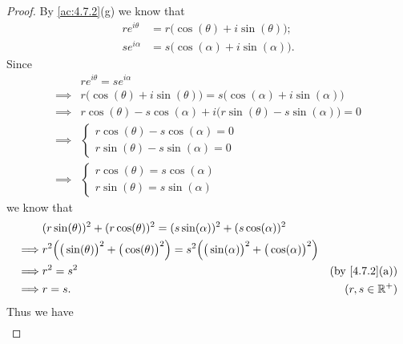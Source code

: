 \begin{proof}
  By \cref{ac:4.7.2}(g) we know that
  \begin{align*}
    r e^{i \theta} & = r \big(\cos(\theta) + i \sin(\theta)\big); \\
    s e^{i \alpha} & = s \big(\cos(\alpha) + i \sin(\alpha)\big).
  \end{align*}
  Since
  \begin{align*}
             & r e^{i \theta} = s e^{i \alpha}                                                       \\
    \implies & r \big(\cos(\theta) + i \sin(\theta)\big) = s \big(\cos(\alpha) + i \sin(\alpha)\big) \\
    \implies & r \cos(\theta) - s \cos(\alpha) + i \big(r \sin(\theta) - s \sin(\alpha)\big) = 0     \\
    \implies & \begin{cases}
                 r \cos(\theta) - s \cos(\alpha) = 0 \\
                 r \sin(\theta) - s \sin(\alpha) = 0
               \end{cases}                                                   \\
    \implies & \begin{cases}
                 r \cos(\theta) = s \cos(\alpha) \\
                 r \sin(\theta) = s \sin(\alpha)
               \end{cases}
  \end{align*}
  we know that
  \begin{align*}
             & (r \sin(\theta))^2 + (r \cos(\theta))^2 = (s \sin(\alpha))^2 + (s \cos(\alpha))^2                                                                                   \\
    \implies & r^2 \Big(\big(\sin(\theta)\big)^2 + \big(\cos(\theta)\big)^2\Big) = s^2 \Big(\big(\sin(\alpha)\big)^2 + \big(\cos(\alpha)\big)^2\Big)                               \\
    \implies & r^2 = s^2                                                                                                                             & \text{(by \cref{4.7.2}(a))} \\
    \implies & r = s.                                                                                                                                & (r, s \in \R^+)
  \end{align*}
  Thus we have
  \begin{align*}

\end{align*}
\end{proof}
